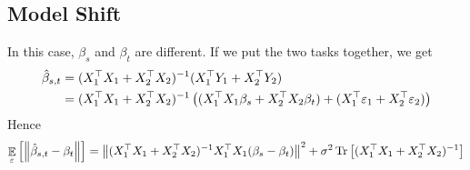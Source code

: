 \subsection{Model Shift}

In this case, $\beta_s$ and $\beta_t$ are different.
If we put the two tasks together, we get
\begin{align}
	\hat{\beta}_{s,t} &= (X_1^{\top}X_1 + X_2^{\top}X_2)^{-1} (X_1^{\top}Y_1 + X_2^{\top}Y_2) \\
	&= (X_1^{\top}X_1 + X_2^{\top}X_2)^{-1} \left({(X_1^{\top}X_1\beta_s + X_2^{\top}X_2\beta_t) + (X_1^{\top}\varepsilon_1 + X_2^{\top}\varepsilon_2)}\right)
\end{align}
Hence
\begin{align}
	\mathop{\mathbb{E}}_{\varepsilon}\left[ \left\| \hat{\beta}_{s,t} - \beta_t \right\| \right]
	= \left\| (X_1^{\top}X_1 + X_2^{\top}X_2)^{-1} X_1^{\top}X_1 (\beta_s - \beta_t) \right\|^2
	+ \sigma^2 \operatorname{Tr}\left[(X_1^{\top}X_1 + X_2^{\top}X_2)^{-1}\right]
\end{align}

